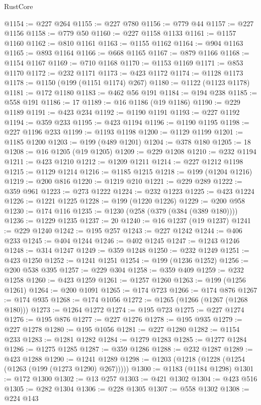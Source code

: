 \begin{lexlean}{RustCore}
\begin{coremodule}
@1154 := @227 @264
@1155 := @227 @780
@1156 := @779 @44
@1157 := @227 @1156
@1158 := @779 @50
@1160 := @227 @1158 @1133
@1161 := @1157 @1160
@1162 := @810 @1161
@1163 := @1155 @1162
@1164 := @904 @1163
@1165 := @893 @1164
@1166 := @668 @1165
@1167 := @879 @1166
@1168 := @1154 @1167
@1169 := @710 @1168
@1170 := @1153 @1169
@1171 := @853 @1170
@1172 := @232 @1171
@1173 := @423 @1172
@1174 := @1128 @1173
@1178 := @1150 (@199 (@1151 @1174) @267)
@1180 := @1122 (@1123 @1178)
@1181 := @172 @1180
@1183 := @462 @56 @191
@1184 := @194 @238
@1185 := @558 @191
@1186 := 17
@1189 := @16 @1186 (@19 @1186)
@1190 := @229 @1189
@1191 := @423 @234
@1192 := @1190 @1191
@1193 := @227 @1192
@1194 := @359 @233
@1195 := @423 @1194
@1196 := @1190 @1195
@1198 := @227 @1196 @233
@1199 := @1193 @1198
@1200 := @1129 @1199
@1201 := @1185 @1200
@1203 := @199 (@489 @1201)
@1204 := @378 @180
@1205 := 18
@1208 := @16 @1205 (@19 @1205)
@1209 := @229 @1208
@1210 := @232 @1194
@1211 := @423 @1210
@1212 := @1209 @1211
@1214 := @227 @1212 @1198
@1215 := @1129 @1214
@1216 := @1185 @1215
@1218 := @199 (@1204 @1216)
@1219 := @200 @816
@1220 := @1219 @210
@1221 := @229 @289
@1222 := @359 @961
@1223 := @273 @1222
@1224 := @232 @1223
@1225 := @423 @1224
@1226 := @1221 @1225
@1228 := @199 (@1220 @1226)
@1229 := @200 @958
@1230 := @174 @116
@1235 := @1230 (@258 (@379 (@384 (@389 @180))))
@1236 := @1229 @1235
@1237 := 20
@1240 := @16 @1237 (@19 @1237)
@1241 := @229 @1240
@1242 := @195 @257
@1243 := @227 @1242
@1244 := @406 @233
@1245 := @404 @1244
@1246 := @402 @1245
@1247 := @1243 @1246
@1248 := @314 @1247
@1249 := @359 @1248
@1250 := @232 @1249
@1251 := @423 @1250
@1252 := @1241 @1251
@1254 := @199 (@1236 @1252)
@1256 := @200 @538 @395
@1257 := @229 @304
@1258 := @359 @409
@1259 := @232 @1258
@1260 := @423 @1259
@1261 := @1257 @1260
@1263 := @199 (@1256 @1261)
@1264 := @200 @1091
@1265 := @174 @723
@1266 := @174 @876
@1267 := @174 @935
@1268 := @174 @1056
@1272 := @1265 (@1266 (@1267 (@1268 @180)))
@1273 := @1264 @1272
@1274 := @195 @723
@1275 := @227 @1274
@1276 := @195 @876
@1277 := @227 @1276
@1278 := @195 @935
@1279 := @227 @1278
@1280 := @195 @1056
@1281 := @227 @1280
@1282 := @1154 @233
@1283 := @1281 @1282
@1284 := @1279 @1283
@1285 := @1277 @1284
@1286 := @1275 @1285
@1287 := @359 @1286
@1288 := @232 @1287
@1289 := @423 @1288
@1290 := @1241 @1289
@1298 := @1203 (@1218 (@1228 (@1254 (@1263 (@199 (@1273 @1290) @267)))))
@1300 := @1183 (@1184 @1298)
@1301 := @172 @1300
@1302 := @13 @257
@1303 := @421 @1302
@1304 := @423 @516
@1305 := @282 @1304
@1306 := @228 @1305
@1307 := @558 @1302
@1308 := @224 @143

\end{coremodule}
\end{lexlean}
